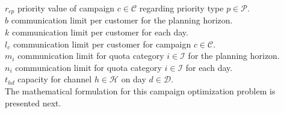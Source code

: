 \documentclass[11pt]{article}
\begin{document}
\begin{singlespace}
\noindent $r_{{c}{p}}$ priority value of campaign $c \in \mathcal{C}$ regarding priority type $p \in \mathcal{P}$.\\

\noindent $b$ communication limit per customer for the planning horizon.\\

\noindent $k$ communication limit per customer for each day.\\

\noindent $l_{c}$ communication limit per customer for campaign $c \in \mathcal{C}$.\\

\noindent $m_{i}$ communication limit for quota category $i \in \mathcal{I}$ for the planning horizon.\\

\noindent $n_{i}$ communication limit for quota category $i \in \mathcal{I}$ for each day.\\

\noindent $t_{{h}{d}}$ capacity for channel $h \in \mathcal{H}$ on day $d \in \mathcal{D}$.\\

\noindent The mathematical formulation for this campaign optimization problem is presented next.
\end{singlespace}
\vspace{-0.5cm}
\end{document}
